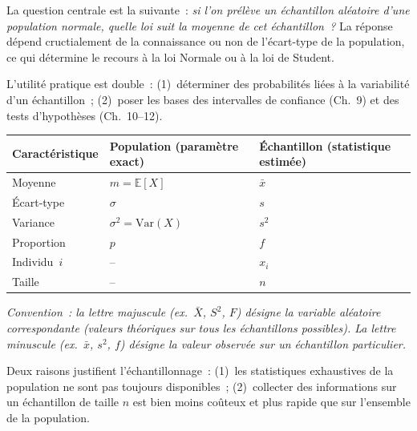 \documentclass[11pt,a4paper]{article}
\newcommand{\E}{\mathbb{E}}
\newcommand{\Var}{\mathrm{Var}}
\begin{document}
La question centrale est la suivante~: \emph{si l'on pr\'el\`eve un \'echantillon al\'eatoire d'une population normale, quelle loi suit la moyenne de cet \'echantillon~?} La r\'eponse d\'epend cructialement de la connaissance ou non de l'\'ecart-type de la population, ce qui d\'etermine le recours \`a la loi Normale ou \`a la loi de Student.

L'utilit\'e pratique est double~: (1)~d\'eterminer des probabilit\'es li\'ees \`a la variabilit\'e d'un \'echantillon~; (2)~poser les bases des intervalles de confiance (Ch.~9) et des tests d'hypoth\`eses (Ch.~10--12).

\begin{defbox}
\renewcommand{\arraystretch}{1.5}
\begin{tabularx}{\linewidth}{lXX}
\toprule
\textbf{Caract\'eristique} & \textbf{Population} (param\`etre exact) & \textbf{\'Echantillon} (statistique estim\'ee) \\
\midrule
Moyenne & $m = \E[X]$ & $\bar{x}$  \\
\'Ecart-type & $\sigma$ & $s$ \quad [\,$S$\,] \\
Variance & $\sigma^2 = \Var(X)$ & $s^2$ \quad [\,$S^2$\,] \\
Proportion & $p$ & $f$ \quad [\,$F$\,] \\
Individu~$i$ & -- & $x_i$ \quad [\,$X_i$\,] \\
Taille & -- & $n$ \\
\bottomrule
\end{tabularx}

\smallskip
\textit{Convention~: la lettre majuscule (ex.\ $\bar{X}$, $S^2$, $F$) d\'esigne la variable al\'eatoire correspondante (valeurs th\'eoriques sur tous les \'echantillons possibles). La lettre minuscule (ex.\ $\bar{x}$, $s^2$, $f$) d\'esigne la valeur observ\'ee sur un \'echantillon particulier.}
\end{defbox}

\begin{alertbox}
Deux raisons justifient l'\'echantillonnage~: (1)~les statistiques exhaustives de la population ne sont pas toujours disponibles~; (2)~collecter des informations sur un \'echantillon de taille $n$ est bien moins co\^uteux et plus rapide que sur l'ensemble de la population.
\end{alertbox}

\end{document}
